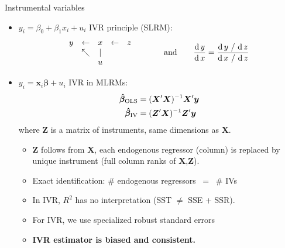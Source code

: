 \documentclass[usenames,dvipsnames]{beamer}
\begin{document}
\begin{frame}{Instrumental variables}
\begin{itemize}
    \item $y_i = \beta_0 + \beta_1 x_i + u_i$ \qquad IVR principle (SLRM):
    $$
    \begin{matrix}
    y & \leftarrow & x & \leftarrow & z \\
      & \nwarrow & | & &\\
      & & u & &
    \end{matrix}
    \qquad \qquad \textnormal{and} \qquad
    \frac{\textnormal{d} \, y}{\textnormal{d} \, x} = 
    \frac{\textnormal{d} \, y ~/~ \textnormal{d} \, z}
    {\textnormal{d} \, x ~/~ \textnormal{d} \, z}
    $$
    \item $y_i = \bm{x}_i \bm{\beta} + u_i$ \qquad IVR in MLRMs:
    \begin{align*}
    \bm{\hat{\beta}}_{\textnormal{OLS}} &= 
    (\bm{X}^{\prime}\bm{X})^{-1} \bm{X}^{\prime}\bm{y} \\
    \bm{\hat{\beta}}_{\textnormal{IV}} &= 
    (\bm{Z}^{\prime}\bm{X})^{-1} \bm{Z}^{\prime}\bm{y}
    \end{align*}
    where $\bm{Z}$ is a matrix of instruments, same dimensions as $\bm{X}$.
    \small{
    \begin{itemize}
        \item $\bm{Z}$ follows from $\bm{X}$, each endogenous regressor (column) is replaced by unique instrument (full column ranks of $\bm{X}$,$\bm{Z}$).
        \item Exact identification: \# endogenous regressors~ =~ \# IVs
        \item In IVR, $R^2$ has no interpretation (SST $\neq$ SSE + SSR).
        \item For IVR, we use specialized robust standard errors
        \item \textbf{IVR estimator is biased and consistent.}
    \end{itemize}
    }
\end{itemize}
\end{frame}
\end{document}
